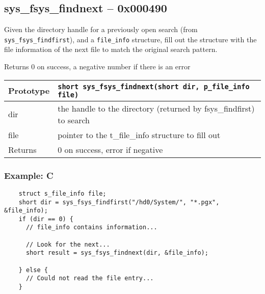 \subsection*{sys\_fsys\_findnext -- 0x000490}
Given the directory handle for a previously open search (from \verb+sys_fsys_findfirst+), and a \verb+file_info+ structure,
fill out the structure with the file information of the next file to match the original search pattern.

Returns 0 on success, a negative number if there is an error

\bigskip

\begin{tabular}{|l||l|} \hline
Prototype & \lstinline!short sys_fsys_findnext(short dir, p_file_info file)! \\ \hline
dir & the handle to the directory (returned by fsys\_findfirst) to search \\ \hline
file & pointer to the t\_file\_info structure to fill out \\ \hline
Returns & 0 on success, error if negative \\ \hline
\end{tabular}

\subsubsection*{Example: C}
\begin{lstlisting}
    struct s_file_info file;
    short dir = sys_fsys_findfirst("/hd0/System/", "*.pgx", &file_info);
    if (dir == 0) {
      // file_info contains information...

      // Look for the next...
      short result = sys_fsys_findnext(dir, &file_info);

    } else {
      // Could not read the file entry...
    }
\end{lstlisting}

